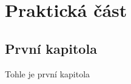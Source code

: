 \part{Praktická část}

\hypertarget{prvnuxed-kapitola}{%
\chapter{První kapitola}\label{prvnuxed-kapitola}}

Tohle je první kapitola~\parencite{nespor05}
